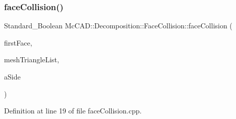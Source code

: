 \subsubsection{\texorpdfstring{face\+Collision()}{faceCollision()}\hspace{0.1cm}{\footnotesize\ttfamily [1/2]}}
{\footnotesize\ttfamily Standard\+\_\+\+Boolean Mc\+C\+A\+D\+::\+Decomposition\+::\+Face\+Collision\+::face\+Collision (\begin{DoxyParamCaption}\item[{const \hyperlink{classMcCAD_1_1Geometry_1_1BoundSurface}{Mc\+C\+A\+D\+::\+Geometry\+::\+Bound\+Surface} \&}]{first\+Face,  }\item[{const std\+::vector$<$ std\+::shared\+\_\+ptr$<$ \hyperlink{classMcCAD_1_1Geometry_1_1MeshTriangle}{Mc\+C\+A\+D\+::\+Geometry\+::\+Mesh\+Triangle} $>$$>$ \&}]{mesh\+Triangle\+List,  }\item[{Standard\+\_\+\+Integer \&}]{a\+Side }\end{DoxyParamCaption})\hspace{0.3cm}{\ttfamily [private]}}



Definition at line 19 of file face\+Collision.\+cpp.



